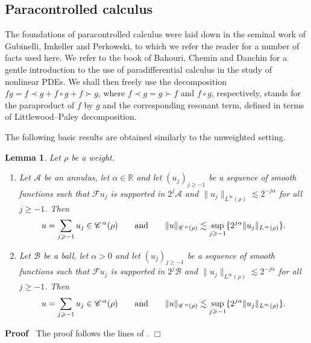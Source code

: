 \documentclass[a4paper,11pt]{article}
\renewcommand{\geq}{\geqslant}
\newenvironment{proof}{\noindent\textbf{Proof\ }}{\hspace*{\fill}$\Box$\medskip}
\newtheorem{lemma}[theorem]{Lemma}
\numberwithin{equation}{section}
\newcommand{\CC}{\mathscr{C} \hspace{.1em}}
\newcommand{\R}{\mathbb{R}}
\newcommand{\8}{\infty}
\begin{document}
\subsection{Paracontrolled calculus}
\label{ssec:para}


The foundations of paracontrolled calculus were laid down in the seminal work \cite{GIP} of Gubinelli, Imkeller and Perkowski, to which we  refer the reader for a number of facts used here. We refer to the book \cite{BCD} of Bahouri, Chemin and Danchin for a gentle introduction to the use of paradifferential calculus in the study of nonlinear PDEs. We shall then freely use the decomposition  $fg=f\prec g+f\circ g+f\succ g$, where $f\prec g=g\succ f$ and $f\circ g$, respectively, stands for the paraproduct of $f$ by $g$ and the corresponding resonant term, defined in terms of Littlewood--Paley decomposition.


The following basic results are obtained similarly to the unweighted setting.

\begin{lemma}\label{lem:bcd}
Let $\rho$ be a weight.
\begin{enumerate}
\item Let $\mathcal{A}$ be an annulus, let $\alpha\in\R$ and let $(u_j)_{j\geq-1}$ be a sequence of smooth functions such that $\mathcal{F}u_j$ is supported in $2^j\mathcal{A}$ and  $\|u_j\|_{L^\infty(\rho)}\lesssim 2^{-j\alpha}$ for all $j\geq-1$. Then
$$
u=\sum_{j\geq-1}u_j\in \CC^\alpha(\rho)\qquad\text{and}\qquad\|u\|_{\CC^\alpha(\rho)}\lesssim \sup_{j\geq -1}\{2^{j\alpha}\|u_j\|_{L^\infty(\rho)}\}.
$$
\item Let $\mathcal{B}$ be a ball, let $\alpha>0$ and let $(u_j)_{j\geq-1}$ be a sequence of smooth functions such that $\mathcal{F}u_j$ is supported in $2^j\mathcal{B}$ and  $\|u_j\|_{L^\infty(\rho)}\lesssim 2^{-j\alpha}$ for all $j\geq-1$. Then
$$
u=\sum_{j\geq-1}u_j\in \CC^\alpha(\rho)\qquad\text{and}\qquad\|u\|_{\CC^\alpha(\rho)}\lesssim \sup_{j\geq -1}\{2^{j\alpha}\|u_j\|_{L^\infty(\rho)}\}.
$$
\end{enumerate}
\end{lemma}

\begin{proof}
The proof follows the lines of \cite[Lemma A.3]{GIP}.
\end{proof}
\end{document}
